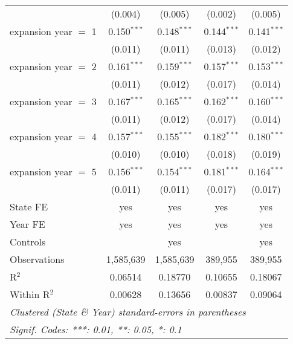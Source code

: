 \documentclass[
]{article}
\let\origtable\table
\let\endorigtable\endtable
\renewenvironment{table}[1][ht]{
      \expandafter\origtable\expandafter[H]
    }{
      \endorigtable
    }
\begin{document}
\begin{table}[htbp]
\begin{adjustbox}{width = 0.6\textwidth, center}
\begin{tabular}{lcccc}
                               & (0.004)       & (0.005)       & (0.002)        & (0.005)\\   
         expansion year $=$ 1  & 0.150$^{***}$ & 0.148$^{***}$ & 0.144$^{***}$  & 0.141$^{***}$\\   
                               & (0.011)       & (0.011)       & (0.013)        & (0.012)\\   
         expansion year $=$ 2  & 0.161$^{***}$ & 0.159$^{***}$ & 0.157$^{***}$  & 0.153$^{***}$\\   
                               & (0.011)       & (0.012)       & (0.017)        & (0.014)\\   
         expansion year $=$ 3  & 0.167$^{***}$ & 0.165$^{***}$ & 0.162$^{***}$  & 0.160$^{***}$\\   
                               & (0.011)       & (0.012)       & (0.017)        & (0.014)\\   
         expansion year $=$ 4  & 0.157$^{***}$ & 0.155$^{***}$ & 0.182$^{***}$  & 0.180$^{***}$\\   
                               & (0.010)       & (0.010)       & (0.018)        & (0.019)\\   
         expansion year $=$ 5  & 0.156$^{***}$ & 0.154$^{***}$ & 0.181$^{***}$  & 0.164$^{***}$\\   
                               & (0.011)       & (0.011)       & (0.017)        & (0.017)\\   
         State FE              & yes           & yes           & yes            & yes\\  
         Year FE               & yes           & yes           & yes            & yes\\  
         Controls              &               & yes           &                & yes\\  
         Observations          & 1,585,639     & 1,585,639     & 389,955        & 389,955\\  
         R$^2$                 & 0.06514       & 0.18770       & 0.10655        & 0.18067\\  
         Within R$^2$          & 0.00628       & 0.13656       & 0.00837        & 0.09064\\  
         \midrule \midrule
         \multicolumn{5}{l}{\emph{Clustered (State \& Year) standard-errors in parentheses}}\\
         \multicolumn{5}{l}{\emph{Signif. Codes: ***: 0.01, **: 0.05, *: 0.1}}\\
      \end{tabular}
   \end{adjustbox}
\end{table}
\end{document}
